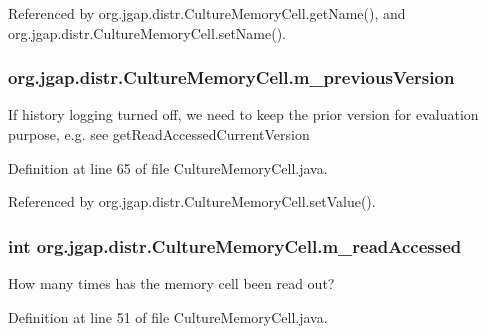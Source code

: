 Referenced by org.\-jgap.\-distr.\-Culture\-Memory\-Cell.\-get\-Name(), and org.\-jgap.\-distr.\-Culture\-Memory\-Cell.\-set\-Name().

\hypertarget{classorg_1_1jgap_1_1distr_1_1_culture_memory_cell_a55628ffd36f474c4ee323c4271d1d051}{
\subsubsection[{m\-\_\-previous\-Version}]{ org.\-jgap.\-distr.\-Culture\-Memory\-Cell.\-m\-\_\-previous\-Version\hspace{0.3cm}{\ttfamily [private]}}}\label{classorg_1_1jgap_1_1distr_1_1_culture_memory_cell_a55628ffd36f474c4ee323c4271d1d051}
If history logging turned off, we need to keep the prior version for evaluation purpose, e.\-g. see get\-Read\-Accessed\-Current\-Version 

Definition at line 65 of file Culture\-Memory\-Cell.\-java.



Referenced by org.\-jgap.\-distr.\-Culture\-Memory\-Cell.\-set\-Value().

\hypertarget{classorg_1_1jgap_1_1distr_1_1_culture_memory_cell_a0451820a22ed1617735b56d93972723e}{
\subsubsection[{m\-\_\-read\-Accessed}]{\setlength{\rightskip}{0pt plus 5cm}int org.\-jgap.\-distr.\-Culture\-Memory\-Cell.\-m\-\_\-read\-Accessed\hspace{0.3cm}{\ttfamily [private]}}}\label{classorg_1_1jgap_1_1distr_1_1_culture_memory_cell_a0451820a22ed1617735b56d93972723e}
How many times has the memory cell been read out? 

Definition at line 51 of file Culture\-Memory\-Cell.\-java.



